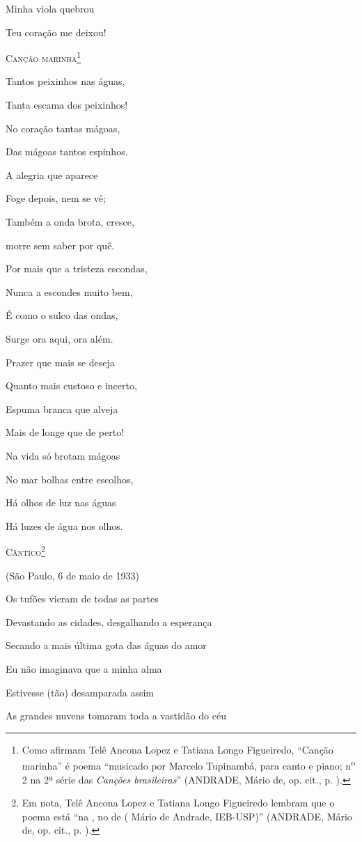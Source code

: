 Minha viola quebrou

Teu coração me deixou!

\textsc{Canção marinha}\footnote{Como afirmam Telê Ancona Lopez e
  Tatiana Longo Figueiredo, ``Canção marinha'' é poema ``musicado por
  Marcelo Tupinambá, para canto e piano; n\textsuperscript{o} 2 na 2ª
  série das \emph{Canções brasileiras}'' (ANDRADE, Mário de, op. cit.,
  p. ).}

Tantos peixinhos nas águas,

Tanta escama dos peixinhos!

No coração tantas mágoas,

Das mágoas tantos espinhos.

A alegria que aparece

Foge depois, nem se vê;

Também a onda brota, cresce,

morre sem saber por quê.

Por mais que a tristeza escondas,

Nunca a escondes muito bem,

É como o sulco das ondas,

Surge ora aqui, ora além.

Prazer que mais se deseja

Quanto mais custoso e incerto,

Espuma branca que alveja

Mais de longe que de perto!

Na vida só brotam mágoas

No mar bolhas entre escolhos,

Há olhos de luz nas águas

Há luzes de água nos olhos.

\textsc{Cântico}\footnote{Em nota, Telê Ancona Lopez e Tatiana Longo
  Figueiredo lembram que o poema está ``na , no de ( Mário de Andrade,
  IEB-USP)'' (ANDRADE, Mário de, op. cit., p. ).}

(São Paulo, 6 de maio de 1933)

Os tufões vieram de todas as partes

Devastando as cidades, desgalhando a esperança

Secando a mais última gota das águas do amor

Eu não imaginava que a minha alma

Estivesse (tão) desamparada assim

As grandes nuvens tomaram toda a vastidão do céu

